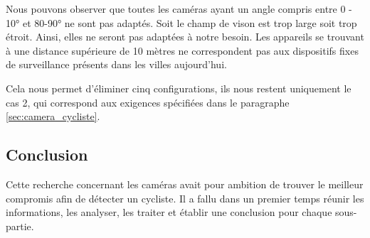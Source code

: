 Nous pouvons observer que toutes les caméras ayant un angle compris entre 0 - 10° et 80-90° ne sont pas adaptés.
Soit le champ de vison est trop large soit trop étroit. Ainsi, elles ne seront pas adaptées à notre besoin.
Les appareils se trouvant à une distance supérieure de 10 mètres ne correspondent pas aux dispositifs fixes de surveillance présents dans les villes aujourd'hui.

Cela nous permet d'éliminer cinq configurations, ils nous restent uniquement le cas 2,
qui correspond aux exigences spécifiées dans le paragraphe \ref{sec:camera_cycliste}.


\subsection{Conclusion}
\label{Conclusion}
Cette recherche concernant les caméras avait pour ambition de trouver le meilleur compromis afin de détecter un cycliste.
Il a fallu dans un premier temps réunir les informations, les analyser, les traiter et établir une conclusion pour chaque sous-partie.

